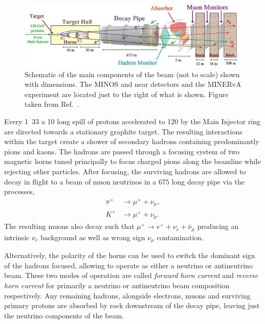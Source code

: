 \begin{figure} %
    \includegraphics[width=\textwidth]{diagrams/4-chips/numi_beam.png}
    \caption[Schematic of the main components of the \numi beam.]
    {Schematic of the main components of the \numi beam (not to scale) shown with dimensions. The
        MINOS and \nova near detectors and the MINERvA experiment are located just to the right
        of what is shown. Figure taken from Ref.~\cite{adamson2016}.}
    \label{fig:numi_beam}
\end{figure}

Every \unit{1.33}{} a \unit{10}{\mu{}} long spill of protons accelerated
to \unit{120}{\GeV} by the Main Injector ring are directed towards a stationary graphite target.
The resulting interactions within the target create a shower of secondary hadrons containing
predominantly pions and kaons. The hadrons are passed through a focusing system of two magnetic
horns tuned principally to focus charged pions along the beamline while rejecting other particles.
After focusing, the surviving hadrons are allowed to decay in flight to a beam of muon neutrinos
in a \unit{675}{} long decay pipe via the processes,
\begin{align} %
    \pi^{+} & \rightarrow\mu^{+}+\nu_{\mu}, \label{eq:pi_decays}   \\
    K^{+}   & \rightarrow\mu^{+}+\nu_{\mu}. \label{eq:kaon_decays}
\end{align}
The resulting muons also decay such that $\mu^{+}\rightarrow e^{+}+\nu_{e}+\bar{\nu}_{\mu}$
producing an intrinsic $\nu_{e}$ background as well as wrong sign $\nu_{\mu}$ contamination.

Alternatively, the polarity of the horns can be used to switch the dominant sign of the hadrons
focused, allowing \numi to operate as either a neutrino or antineutrino beam. These two modes of
operation are called \emph{forward horn current} and \emph{reverse horn current} for primarily a
neutrino or antineutrino beam composition respectively. Any remaining hadrons, alongside
electrons, muons and surviving primary protons are absorbed by rock downstream of the decay pipe,
leaving just the neutrino components of the beam.

